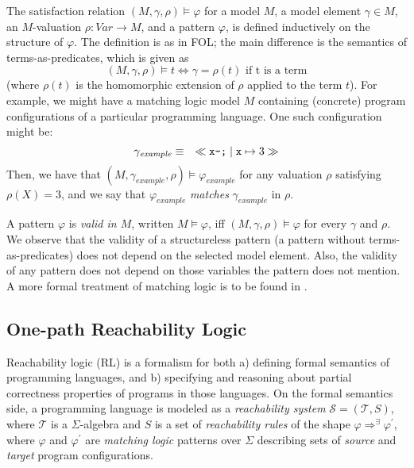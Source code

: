 The satisfaction relation $(M, \gamma, \rho) \vDash \varphi$ for a model $M$, a model element $\gamma \in M$,
an $M$-valuation $\rho : \mathit{Var} \to M$, and a pattern $\varphi$, is defined inductively on the structure of $\varphi$.
The definition is as in FOL; the main difference is the semantics of
terms-as-predicates, which is given as
\begin{equation*}
    (M, \gamma, \rho) \vDash t \iff \gamma = \rho(t) \text{ if t is a term}
\end{equation*}
(where $\rho(t)$ is the homomorphic extension of $\rho$ applied to the term $t$).
For example, we might have a matching logic model $M$ containing (concrete) program configurations
of a particular programming language.
One such configuration might be:
\begin{equation*}
  \gamma_{\mathit{example}} \equiv\quad \ll\texttt{x--;}\mid \mathtt{x}\mapsto 3\gg
\end{equation*}
Then, we have that $(M, \gamma_{\mathit{example}}, \rho) \vDash \varphi_{\mathit{example}}$
for any valuation $\rho$ satisfying $\rho(X) = 3$, and we say that
$\varphi_{\mathit{example}}$ \emph{matches} $\gamma_{\mathit{example}}$ in $\rho$.


A pattern $\varphi$ is \emph{valid in $M$}, written $M \vDash \varphi$, iff $(M, \gamma, \rho) \vDash \varphi$
for every $\gamma$ and $\rho$.
We observe that the validity of a structureless pattern (a pattern without terms-as-predicates) does not depend on the selected model element.
Also, the validity of any pattern does not depend on those variables the pattern does not mention.
A more formal treatment of matching logic is to be found in .


\subsection{One-path Reachability Logic}
Reachability logic \cite{RosuS12oopsla, StefanescuCMMSR19} (RL) is a formalism for
both a) defining formal semantics of programming languages,
and b) specifying and reasoning about partial correctness properties
of programs in those languages.
On the formal semantics side, a programming language is modeled as a \emph{reachability system}
$\mathcal{S} = (\mathcal{T}, S)$, where $\mathcal{T}$ is a $\Sigma$-algebra
and $S$ is a set of \emph{reachability rules} of the shape $\varphi \Rightarrow^\exists \varphi^\prime$,
where $\varphi$ and $\varphi^\prime$ are \emph{matching logic} patterns over $\Sigma$
describing sets of \emph{source} and \emph{target} program configurations.

